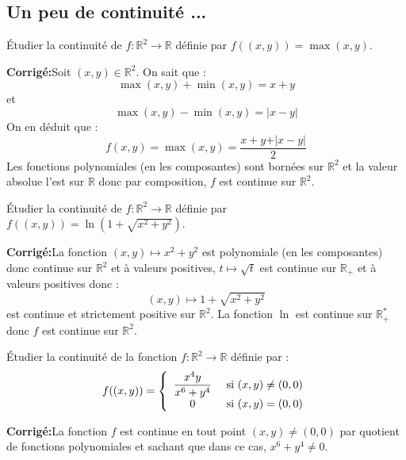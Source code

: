 \documentclass[a4paper,twoside,french,11pt]{VcCours}
\newcommand{\corr}{\textbf{Corrigé:}}
\begin{document}

\tableofcontents
\separationTitre


\subsection{Un peu de continuité ...}



\begin{Exercice}{} Étudier la continuité de $f : \mathbb{R}^2 \rightarrow \mathbb{R}$ définie par $ f((x,y))=  \max(x,y)$.
\end{Exercice}

\corr Soit $(x,y) \in \mathbb{R}^2$. On sait que :
$$ \max(x,y)+ \min(x,y) = x+y$$
et 
$$ \max(x,y)-\min(x,y) = \vert x-y \vert$$
On en déduit que :
$$ f(x,y)= \max(x,y) = \dfrac{x+y+ \vert x-y \vert}{2}$$
Les fonctions polynomiales (en les composantes) sont bornées sur $\mathbb{R}^2$ et la valeur absolue l'est sur $\mathbb{R}$ donc par composition, $f$ est continue sur $\mathbb{R}^2$.

\begin{Exercice}{} Étudier la continuité de $f : \mathbb{R}^2 \rightarrow \mathbb{R}$ définie par $f((x,y))= \ln(1 + \sqrt{x^2+y^2})$.
\end{Exercice}

\corr La fonction $(x,y) \mapsto x^2+y^2$ est polynomiale (en les composantes) donc continue sur $\mathbb{R}^2$ et à valeurs positives, $t \mapsto \sqrt{t}$ est continue sur $\mathbb{R}_+$ et à valeurs positives donc :
$$ (x,y) \mapsto 1+ \sqrt{x^2+y^2}$$
est continue et strictement positive sur $\mathbb{R}^2$. La fonction $\ln$ est continue sur $\mathbb{R}_+^{*}$ donc $f$ est continue sur $\mathbb{R}^2$.

\begin{Exercice}{} Étudier la continuité de la fonction $f : \mathbb{R}^2 \rightarrow \mathbb{R}$ définie par :
$$ f((x,y)) = \left\lbrace \begin{array}{cl}
\dfrac{x^4 y}{x^6+y^4} & \hbox{ si } (x,y) \neq (0,0) \\
0 & \hbox{ si } (x,y)=(0,0) \\
\end{array}\right.$$
\end{Exercice}

\corr La fonction $f$ est continue en tout point $(x,y) \neq (0,0)$ par quotient de fonctions polynomiales et sachant que dans ce cas, $x^6+y^4 \neq 0$. 
\end{document}
